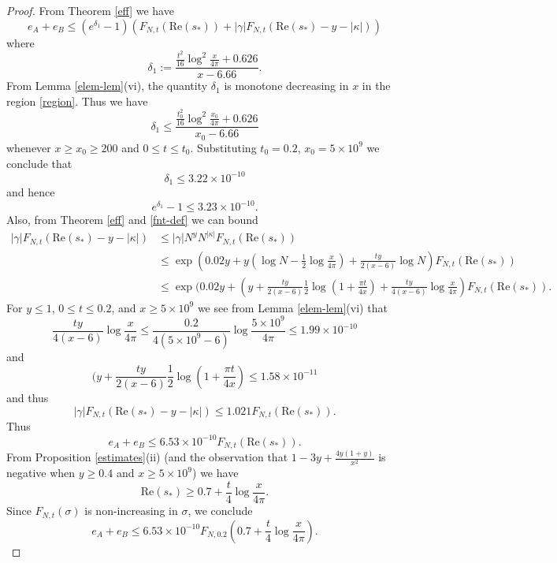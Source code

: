 \begin{proof}
From Theorem \ref{eff} we have
\begin{equation}\label{eaeb-bound}
 e_A + e_B \leq (e^{\delta_1}-1) (F_{N,t}(\mathrm{Re}(s_*)) + |\gamma| F_{N,t}( \mathrm{Re}(s_*) - y - |\kappa| ) )
\end{equation}
where
$$ \delta_1 := \frac{\frac{t^2}{16} \log^2 \frac{x}{4\pi} + 0.626}{x-6.66}.$$
From Lemma \ref{elem-lem}(vi), the quantity $\delta_1$ is monotone decreasing in $x$ in the region \eqref{region}.  Thus we have
\begin{equation}\label{delta1-bound}
 \delta_1 \leq \frac{\frac{t_0^2}{16} \log^2 \frac{x_0}{4\pi} + 0.626}{x_0-6.66}
\end{equation}
whenever $x \geq x_0 \geq 200$ and $0 \leq t \leq t_0$.  Substituting $t_0 = 0.2$, $x_0 = 5 \times 10^9$ we conclude that
$$  \delta_1 \leq 3.22 \times 10^{-10}$$
and hence
$$ e^{\delta_1} - 1 \leq 3.23 \times 10^{-10}.$$
Also, from Theorem \ref{eff} and \eqref{fnt-def} we can bound
\begin{align*}
|\gamma| F_{N,t}( \mathrm{Re}(s_*) - y - |\kappa| ) &\leq |\gamma| N^y N^{|\kappa|} F_{N,t}( \mathrm{Re}(s_*) ) \\
&\leq \exp( 0.02 y + y (\log N - \frac{1}{2} \log \frac{x}{4\pi}) + \frac{ty}{2(x-6)} \log N ) F_{N,t}( \mathrm{Re}(s_*) )  \\
&\leq \exp( 0.02 y + (y + \frac{ty}{2(x-6)} \frac{1}{2} \log(1 + \frac{\pi t}{4x}) + \frac{ty}{4(x-6)} \log \frac{x}{4\pi} ) F_{N,t}( \mathrm{Re}(s_*) ).
\end{align*}
For $y \leq 1$, $0 \leq t \leq 0.2$, and $x \geq 5 \times 10^9$ we see from Lemma \ref{elem-lem}(vi) that
$$ \frac{ty}{4(x-6)} \log \frac{x}{4\pi} \leq \frac{0.2}{4(5 \times 10^9-6)}\log \frac{5 \times 10^9}{4\pi} \leq 1.99 \times 10^{-10}$$
and
$$ (y + \frac{ty}{2(x-6)} \frac{1}{2} \log(1 + \frac{\pi t}{4x}) \leq 1.58 \times 10^{-11}$$
and thus
\begin{equation}\label{gafn}
 |\gamma| F_{N,t}( \mathrm{Re}(s_*) - y - |\kappa| ) \leq 1.021  F_{N,t}( \mathrm{Re}(s_*) ).
\end{equation}
Thus
$$  e_A + e_B \leq 6.53 \times 10^{-10} F_{N,t}( \mathrm{Re}(s_*) ).$$
From Proposition \ref{estimates}(ii) (and the observation that $1-3y+\frac{4y(1+y)}{x^2}$ is negative when $y \geq 0.4$ and $x \geq 5 \times 10^9$) we have
$$ \mathrm{Re}(s_*) \geq 0.7 + \frac{t}{4} \log \frac{x}{4\pi}.$$
Since $F_{N,t}(\sigma)$ is non-increasing in $\sigma$, we conclude
$$  e_A + e_B \leq 6.53 \times 10^{-10} F_{N,0.2}( 0.7 + \frac{t}{4} \log \frac{x}{4\pi} ).$$


\end{proof}
